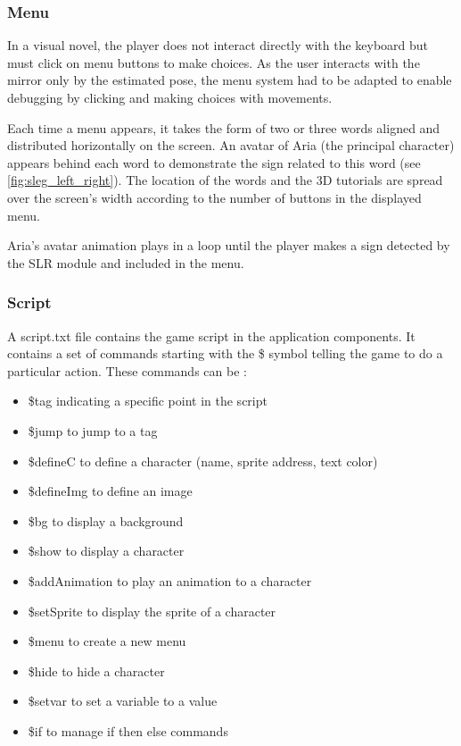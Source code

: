 \subsubsection{Menu}

In a visual novel, the player does not interact directly with the keyboard but must click on menu buttons to make choices. As the user interacts with the mirror only by the estimated pose, the menu system had to be adapted to enable debugging by clicking and making choices with movements.

Each time a menu appears, it takes the form of two or three words aligned and distributed horizontally on the screen. An avatar of Aria (the principal character) appears behind each word to demonstrate the sign related to this word (see \ref{fig:sleg_left_right}). The location of the words and the 3D tutorials are spread over the screen's width according to the number of buttons in the displayed menu. 

Aria's avatar animation plays in a loop until the player makes a sign detected by the SLR module and included in the menu. 

\subsubsection{Script}

A script.txt file contains the game script in the application components. It contains a set of commands starting with the \$ symbol telling the game to do a particular action. These commands can be :
\begin{itemize}
    \item \$tag indicating a specific point in the script
    \item \$jump to jump to a tag
    \item \$defineC to define a character (name, sprite address, text color)
    \item \$defineImg to define an image
    \item \$bg to display a background
    \item \$show to display a character
    \item \$addAnimation to play an animation to a character
    \item \$setSprite to display the sprite of a character
    \item \$menu to create a new menu
    \item \$hide to hide a character
    \item \$setvar to set a variable to a value
    \item \$if to manage if then else commands
\end{itemize}

